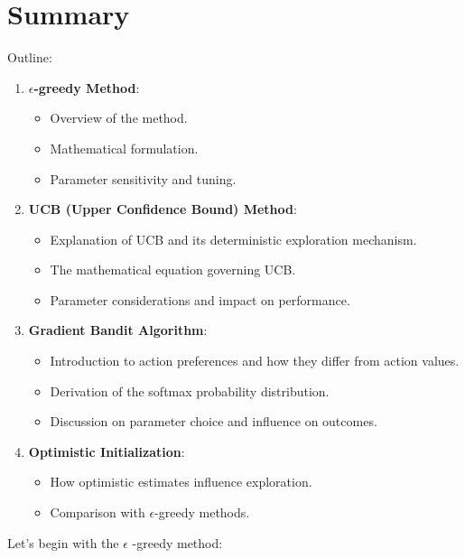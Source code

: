 \documentclass[
  letterpaper,
]{krantz}
\providecommand{\tightlist}{%
  \setlength{\itemsep}{0pt}\setlength{\parskip}{0pt}}\usepackage{longtable,booktabs,array}
\theoremstyle{plain}
\theoremstyle{definition}
\theoremstyle{definition}
\theoremstyle{remark}
\begin{document}
\section{Summary}\label{summary}

Outline:

\begin{enumerate}
\def\labelenumi{\arabic{enumi}.}
\tightlist
\item
  \textbf{\(\epsilon\)-greedy Method}:

  \begin{itemize}
  \tightlist
  \item
    Overview of the method.
  \item
    Mathematical formulation.
  \item
    Parameter sensitivity and tuning.
  \end{itemize}
\item
  \textbf{UCB (Upper Confidence Bound) Method}:

  \begin{itemize}
  \tightlist
  \item
    Explanation of UCB and its deterministic exploration mechanism.
  \item
    The mathematical equation governing UCB.
  \item
    Parameter considerations and impact on performance.
  \end{itemize}
\item
  \textbf{Gradient Bandit Algorithm}:

  \begin{itemize}
  \tightlist
  \item
    Introduction to action preferences and how they differ from action
    values.
  \item
    Derivation of the softmax probability distribution.
  \item
    Discussion on parameter choice and influence on outcomes.
  \end{itemize}
\item
  \textbf{Optimistic Initialization}:

  \begin{itemize}
  \tightlist
  \item
    How optimistic estimates influence exploration.
  \item
    Comparison with \(\epsilon\)-greedy methods.
  \end{itemize}
\end{enumerate}

Let's begin with the \(\epsilon\) -greedy method:
\end{document}
